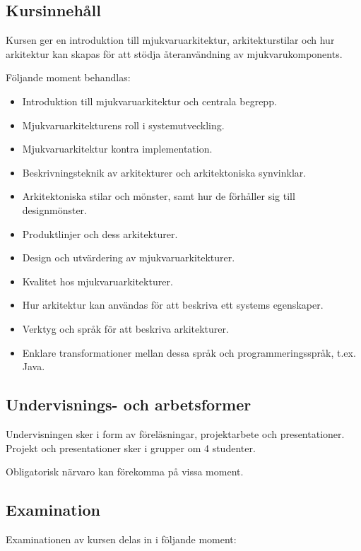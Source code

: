 \subsection*{Kursinnehåll}

Kursen ger en introduktion till mjukvaruarkitektur, arkitekturstilar och
hur arkitektur kan skapas för att stödja återanvändning av
mjukvarukomponents.

Följande moment behandlas:

\begin{itemize}
\tightlist
\item
  Introduktion till mjukvaruarkitektur och centrala begrepp.
\item
  Mjukvaruarkitekturens roll i systemutveckling.
\item
  Mjukvaruarkitektur kontra implementation.
\item
  Beskrivningsteknik av arkitekturer och arkitektoniska synvinklar.
\item
  Arkitektoniska stilar och mönster, samt hur de förhåller sig till
  designmönster.
\item
  Produktlinjer och dess arkitekturer.
\item
  Design och utvärdering av mjukvaruarkitekturer.
\item
  Kvalitet hos mjukvaruarkitekturer.
\item
  Hur arkitektur kan användas för att beskriva ett systems egenskaper.
\item
  Verktyg och språk för att beskriva arkitekturer.
\item
  Enklare transformationer mellan dessa språk och programmeringsspråk,
  t.ex. Java.
\end{itemize}

\subsection*{Undervisnings- och
arbetsformer}

Undervisningen sker i form av föreläsningar, projektarbete och
presentationer. Projekt och presentationer sker i grupper om 4
studenter.

Obligatorisk närvaro kan förekomma på vissa moment.

\subsection*{Examination}

Examinationen av kursen delas in i följande moment:

